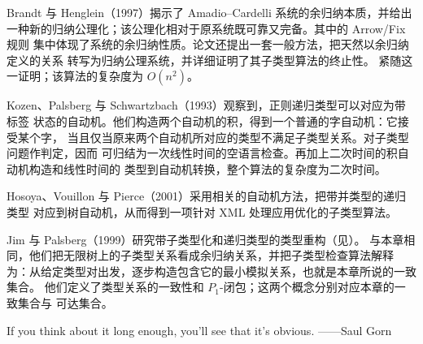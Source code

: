 Brandt 与 Henglein（1997）揭示了 Amadio--Cardelli 系统的余归纳本质，并给出
一种新的归纳公理化；该公理化相对于原系统既可靠又完备。其中的 Arrow/Fix 规则
集中体现了系统的余归纳性质。论文还提出一套一般方法，把天然以余归纳定义的关系
转写为归纳公理系统，并详细证明了其子类型算法的终止性。
紧随这一证明；该算法的复杂度为 \(O(n^2)\)。

Kozen、Palsberg 与 Schwartzbach（1993）观察到，正则递归类型可以对应为带标签
状态的自动机。他们构造两个自动机的积，得到一个普通的字自动机：它接受某个字，
当且仅当原来两个自动机所对应的类型不满足子类型关系。对子类型问题作判定，因而
可归结为一次线性时间的空语言检查。再加上二次时间的积自动机构造和线性时间的
类型到自动机转换，整个算法的复杂度为二次时间。

Hosoya、Vouillon 与 Pierce（2001）采用相关的自动机方法，把带并类型的递归类型
对应到树自动机，从而得到一项针对 XML 处理应用优化的子类型算法。

Jim 与 Palsberg（1999）研究带子类型化和递归类型的类型重构（见）。
与本章相同，他们把无限树上的子类型关系看成余归纳关系，并把子类型检查算法解释
为：从给定类型对出发，逐步构造包含它的最小模拟关系，也就是本章所说的一致集合。
他们定义了类型关系的一致性和 \(P_1\)-闭包；这两个概念分别对应本章的一致集合与
可达集合。

  {If you think about it long enough, you'll see that it's obvious.}
  {——Saul Gorn}
